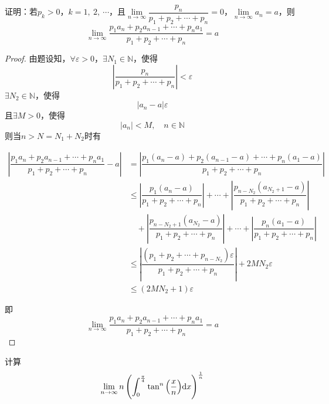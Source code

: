 \begin{proposition}
    
    证明：若$p_k > 0$，$k = 1,\ 2,\ \cdots$，且$\lim\limits_{n\to \infty}{\dfrac{p_n}{p_1 + p_2 + \cdots + p_n}} = 0$，$\lim\limits_{n \to \infty}{a_n} = a$，则
    $$\lim\limits_{n \to \infty}{\dfrac{p_1 a_n + p_2 a_{n - 1} + \cdots + p_n a_1}{p_1 + p_2 + \cdots + p_n}} = a$$

\end{proposition}

\begin{proof}

    由题设知，$\forall \varepsilon > 0$，$\exists N_1 \in \mathbb{N}$，使得
    $$\left| \dfrac{p_n}{p_1 + p_2 + \cdots + p_n} \right| < \varepsilon$$
    $\exists N_2 \in \mathbb{N}$，使得
    $$|a_n - a| \varepsilon$$
    且$\exists M > 0$，使得
    $$|a_n| < M, \quad n \in \mathbb{N}$$
    则当$n > N = N_1 + N_2$时有

    \begin{align*}
        \left|\dfrac{p_1 a_n + p_2 a_{n - 1} + \cdots + p_n a_1}{p_1 + p_2 + \cdots + p_n} - a\right| & = \left| \dfrac{p_1 (a_n - a) + p_2 (a_{n - 1} - a) + \cdots + p_n (a_1 - a)}{p_1 + p_2 + \cdots + p_n} \right| \\
        & \leq \left| \dfrac{p_1 (a_n - a)}{p_1 + p_2 + \cdots + p_n} \right| + \cdots + \left| \dfrac{p_{n - N_2} (a_{N_2 + 1} - a)}{p_1 + p_2 + \cdots + p_n} \right| \\
        & \quad + \left| \dfrac{p_{n - N_2 + 1} (a_{N_2} - a)}{p_1 + p_2 + \cdots + p_n} \right| + \cdots + \left| \dfrac{p_n (a_1 - a)}{p_1 + p_2 + \cdots + p_n} \right| \\
        & \leq \left| \dfrac{(p_1 + p_2 + \cdots + p_{n - N_2})\varepsilon}{p_1 + p_2 + \cdots + p_n} \right| + 2M N_2 \varepsilon \\
        & \leq (2M N_2 + 1) \varepsilon
    \end{align*}

    即
    $$\lim\limits_{n \to \infty}{\dfrac{p_1 a_n + p_2 a_{n - 1} + \cdots + p_n a_1}{p_1 + p_2 + \cdots + p_n}} = a$$
    
\end{proof}

\begin{proposition}

    计算
    $$\lim\limits_{n \to \infty}{n \left( \int_{0}^{\frac{\pi}{4}}{\tan^n{\left( \dfrac{x}{n} \right)}}\mathrm{d} x \right)^{\frac{1}{n}}}$$

\end{proposition}

